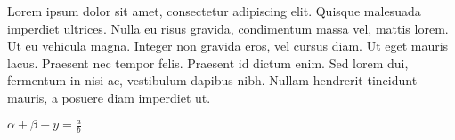 \documentclass{book}
\begin{document}
Lorem ipsum dolor sit amet, consectetur adipiscing elit. Quisque malesuada imperdiet ultrices. Nulla eu risus gravida, condimentum massa vel, mattis lorem. Ut eu vehicula magna. Integer non gravida eros, vel cursus diam. Ut eget mauris lacus. Praesent nec tempor felis. Praesent id dictum enim. Sed lorem dui, fermentum in nisi ac, vestibulum dapibus nibh. Nullam hendrerit tincidunt mauris, a posuere diam imperdiet ut.

$\alpha +\beta  -y=\frac{a}{b}$
\end{document}
